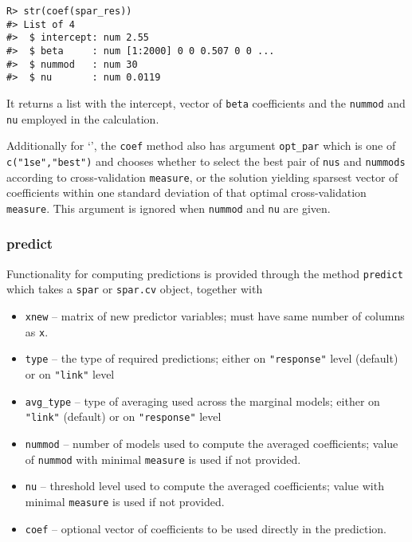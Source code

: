 \documentclass[
  article]{jss}
\newcommand{\class}[1]{`\code{#1}'}
\begin{document}
\begin{verbatim}
R> str(coef(spar_res))
#> List of 4
#>  $ intercept: num 2.55
#>  $ beta     : num [1:2000] 0 0 0.507 0 0 ...
#>  $ nummod   : num 30
#>  $ nu       : num 0.0119
\end{verbatim}

It returns a list with the intercept, vector of \texttt{beta}
coefficients and the \texttt{nummod} and \texttt{nu} employed in the
calculation.

Additionally for \class{spar.cv}, the \texttt{coef} method also has
argument \texttt{opt\_par} which is one of \texttt{c("1se","best")} and
chooses whether to select the best pair of \texttt{nus} and
\texttt{nummods} according to cross-validation \texttt{measure}, or the
solution yielding sparsest vector of coefficients within one standard
deviation of that optimal cross-validation \texttt{measure}. This
argument is ignored when \texttt{nummod} and \texttt{nu} are given.

\subsubsection{predict}\label{predict}

Functionality for computing predictions is provided through the method
\texttt{predict} which takes a \texttt{spar} or \texttt{spar.cv} object,
together with

\begin{itemize}
\item
  \texttt{xnew} -- matrix of new predictor variables; must have same
  number of columns as \texttt{x}.
\item
  \texttt{type} -- the type of required predictions; either on
  \texttt{"response"} level (default) or on \texttt{"link"} level
\item
  \texttt{avg\_type} -- type of averaging used across the marginal
  models; either on \texttt{"link"} (default) or on \texttt{"response"}
  level
\item
  \texttt{nummod} -- number of models used to compute the averaged
  coefficients; value of \texttt{nummod} with minimal \texttt{measure}
  is used if not provided.
\item
  \texttt{nu} -- threshold level used to compute the averaged
  coefficients; value with minimal \texttt{measure} is used if not
  provided.
\item
  \texttt{coef} -- optional vector of coefficients to be used directly
  in the prediction.
\end{itemize}
\end{document}
